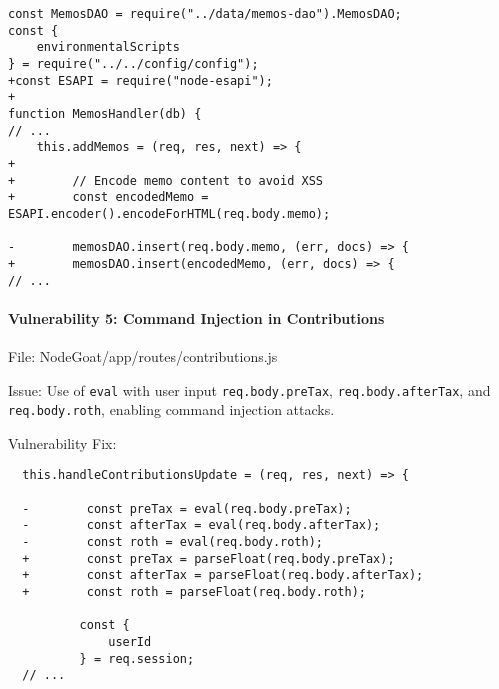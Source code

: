   \begin{framed}\scriptsize
\begin{verbatim}
const MemosDAO = require("../data/memos-dao").MemosDAO;
const {
    environmentalScripts
} = require("../../config/config");
+const ESAPI = require("node-esapi");
+
function MemosHandler(db) {
// ...
    this.addMemos = (req, res, next) => {
+
+        // Encode memo content to avoid XSS
+        const encodedMemo = ESAPI.encoder().encodeForHTML(req.body.memo);

-        memosDAO.insert(req.body.memo, (err, docs) => {
+        memosDAO.insert(encodedMemo, (err, docs) => {
// ...
\end{verbatim}
      
  \end{framed}\normalsize
  
  \hypertarget{vulnerability-5-command-injection-in-contributions}{%
  \paragraph{Vulnerability 5: Command Injection in
  Contributions}\label{vulnerability-5-command-injection-in-contributions}}
  
  File: NodeGoat/app/routes/contributions.js
  
  Issue: Use of \texttt{eval} with user input \texttt{req.body.preTax},
  \texttt{req.body.afterTax}, and \texttt{req.body.roth}, enabling command
  injection attacks.
  
  Vulnerability Fix:
  
  \begin{framed}\scriptsize
\begin{verbatim}
  this.handleContributionsUpdate = (req, res, next) => {
  
  -        const preTax = eval(req.body.preTax);
  -        const afterTax = eval(req.body.afterTax);
  -        const roth = eval(req.body.roth);
  +        const preTax = parseFloat(req.body.preTax);
  +        const afterTax = parseFloat(req.body.afterTax);
  +        const roth = parseFloat(req.body.roth);
  
          const {
              userId
          } = req.session;
  // ...
  \end{verbatim}
      
  \end{framed}\normalsize
